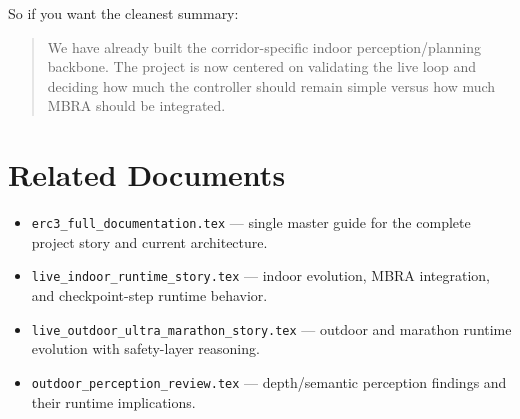 \documentclass[11pt,a4paper]{article}
\begin{document}
So if you want the cleanest summary:

\begin{quote}
We have already built the corridor-specific indoor perception/planning backbone.
The project is now centered on validating the live loop and deciding how much
the controller should remain simple versus how much MBRA should be integrated.
\end{quote}


\section{Related Documents}
\begin{itemize}
  \item \texttt{erc3\_full\_documentation.tex} --- single master guide for the complete project story and current architecture.
  \item \texttt{live\_indoor\_runtime\_story.tex} --- indoor evolution, MBRA integration, and checkpoint-step runtime behavior.
  \item \texttt{live\_outdoor\_ultra\_marathon\_story.tex} --- outdoor and marathon runtime evolution with safety-layer reasoning.
  \item \texttt{outdoor\_perception\_review.tex} --- depth/semantic perception findings and their runtime implications.
\end{itemize}
\end{document}
